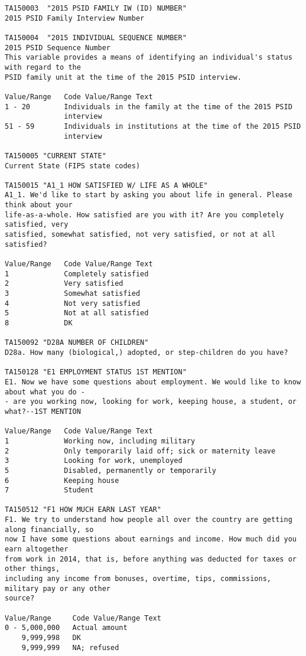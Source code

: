 \documentclass[]{book}
\theoremstyle{definition}
\theoremstyle{definition}
\theoremstyle{remark}
\begin{document}
\begin{verbatim}
TA150003  "2015 PSID FAMILY IW (ID) NUMBER"
2015 PSID Family Interview Number

TA150004  "2015 INDIVIDUAL SEQUENCE NUMBER"
2015 PSID Sequence Number
This variable provides a means of identifying an individual's status with regard to the
PSID family unit at the time of the 2015 PSID interview.

Value/Range   Code Value/Range Text
1 - 20        Individuals in the family at the time of the 2015 PSID
              interview
51 - 59       Individuals in institutions at the time of the 2015 PSID
              interview

TA150005 "CURRENT STATE"
Current State (FIPS state codes)

TA150015 "A1_1 HOW SATISFIED W/ LIFE AS A WHOLE"
A1_1. We'd like to start by asking you about life in general. Please think about your
life-as-a-whole. How satisfied are you with it? Are you completely satisfied, very
satisfied, somewhat satisfied, not very satisfied, or not at all satisfied?

Value/Range   Code Value/Range Text
1             Completely satisfied
2             Very satisfied
3             Somewhat satisfied
4             Not very satisfied
5             Not at all satisfied
8             DK

TA150092 "D28A NUMBER OF CHILDREN"
D28a. How many (biological,) adopted, or step-children do you have?

TA150128 "E1 EMPLOYMENT STATUS 1ST MENTION"
E1. Now we have some questions about employment. We would like to know about what you do -
- are you working now, looking for work, keeping house, a student, or what?--1ST MENTION

Value/Range   Code Value/Range Text
1             Working now, including military
2             Only temporarily laid off; sick or maternity leave
3             Looking for work, unemployed
5             Disabled, permanently or temporarily
6             Keeping house
7             Student

TA150512 "F1 HOW MUCH EARN LAST YEAR"
F1. We try to understand how people all over the country are getting along financially, so
now I have some questions about earnings and income. How much did you earn altogether
from work in 2014, that is, before anything was deducted for taxes or other things,
including any income from bonuses, overtime, tips, commissions, military pay or any other
source?

Value/Range     Code Value/Range Text
0 - 5,000,000   Actual amount
    9,999,998   DK
    9,999,999   NA; refused
\end{verbatim}
\end{document}
